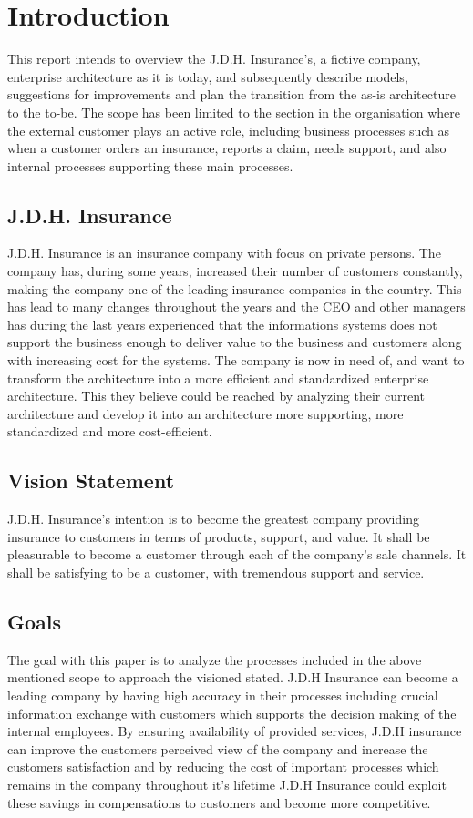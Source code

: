 \section{Introduction}
\label{sec:introduction}
This report intends to overview the J.D.H. Insurance's, a fictive company, enterprise architecture as it is today, and subsequently describe models, suggestions for improvements and plan the transition from the as-is architecture to the to-be. The scope has been limited to the section in the organisation where the external customer plays an active role, including business processes such as when a customer orders an insurance, reports a claim, needs support, and also internal processes supporting these main processes.
\subsection{J.D.H. Insurance}
\label{sec:j_d_h_insurance}
J.D.H. Insurance is an insurance company with focus on private persons. The company has, during some years, increased their number of customers constantly, making the company one of the leading insurance companies in the country. This has lead to many changes throughout the years and the CEO and other managers has during the last years experienced that the informations systems does not support the business enough to deliver value to the business and customers along with increasing cost for the systems. The company is now in need of, and want to transform the architecture into a more efficient and standardized enterprise architecture. This they believe could be reached by analyzing their current architecture and develop it into an architecture more supporting, more standardized and more cost-efficient.
\subsection{Vision Statement}
\label{sec:vision_statement}
J.D.H. Insurance's intention is to become the greatest company providing insurance to customers in terms of products, support, and value. It shall be pleasurable to become a customer through each of the company's sale channels. It shall be satisfying to be a customer, with tremendous support and service.
\subsection{Goals}
\label{sec:goals}
The goal with this paper is to analyze the processes included in the above mentioned scope to approach the visioned stated. J.D.H Insurance can become a leading company by having high accuracy in their processes including crucial information exchange with customers which supports the decision making of the internal employees. By ensuring availability of provided services, J.D.H insurance can improve the customers perceived view of the company and increase the customers satisfaction and by reducing the cost of important processes which remains in the company throughout it’s lifetime J.D.H Insurance could exploit these savings in compensations to customers and become more competitive.
